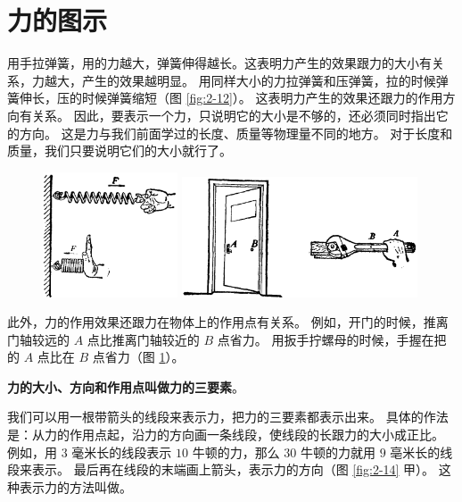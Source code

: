 \section{力的图示}\label{sec:2-6}

用手拉弹簧，用的力越大，弹簧伸得越长。这表明力产生的效果跟力的大小有关系，力越大，产生的效果越明显。
用同样大小的力拉弹簧和压弹簧，拉的时候弹簧伸长，压的时候弹簧缩短（图 \ref{fig:2-12}）。
这表明力产生的效果还跟力的作用方向有关系。
因此，要表示一个力，只说明它的大小是不够的，还必须同时指出它的方向。
这是力与我们前面学过的长度、质量等物理量不同的地方。
对于长度和质量，我们只要说明它们的大小就行了。

\begin{figure}[htbp]
    \centering
    \begin{minipage}{4cm}
    \centering
    \includegraphics[width=4cm]{../pic/czwl1-ch2-12}
    \caption{}\label{fig:2-12}
    \end{minipage}
    \qquad
    \begin{minipage}{7cm}
    \centering
    \includegraphics[width=7cm]{../pic/czwl1-ch2-13}
    \caption{}\label{fig:2-13}
    \end{minipage}
\end{figure}

此外，力的作用效果还跟力在物体上的作用点有关系。
例如，开门的时候，推离门轴较远的 $A$ 点比推离门轴较近的 $B$ 点省力。
用扳手拧螺母的时候，手握在把的 $A$ 点比在 $B$ 点省力（图 \ref{fig:2-13}）。

\textbf{力的大小、方向和作用点叫做力的三要素}。

我们可以用一根带箭头的线段来表示力，把力的三要素都表示出来。
具体的作法是：从力的作用点起，沿力的方向画一条线段，使线段的长跟力的大小成正比。
例如，用 $3$ 毫米长的线段表示 $10$ 牛顿的力，那么 $30$ 牛顿的力就用 $9$ 亳米长的线段来表示。
最后再在线段的末端画上箭头，表示力的方向（图 \ref{fig:2-14} 甲）。
这种表示力的方法叫做。

